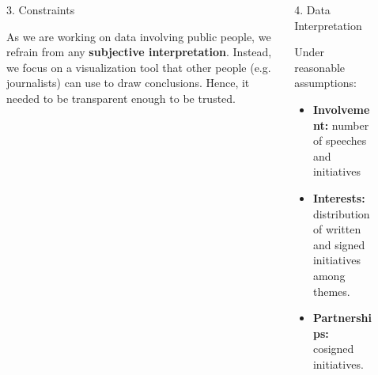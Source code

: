 \documentclass[final]{beamer}
\newlength{\sepwid}
\newlength{\onecolwid}
\newlength{\twocolwid}
\begin{document}
\begin{frame}[t]
\begin{columns}[t]
\begin{column}{\onecolwid}
\end{column} %

\begin{column}{\sepwid}\end{column} %

\begin{column}{\twocolwid} %

\begin{columns}[t,totalwidth=\twocolwid] %

\begin{column}{\onecolwid}\vspace{-.6in} %



\begin{alertblock}{3. Constraints}

As we are working on data involving public people, we refrain from any \textbf{subjective interpretation}. Instead, we focus on a visualization tool that other people (e.g. journalists) can use to draw conclusions. Hence, it needed to be transparent enough to be trusted.

\end{alertblock}



\end{column} %

\begin{column}{\onecolwid}\vspace{-.6in} %



\begin{alertblock}{4. Data Interpretation}

Under reasonable assumptions:
\begin{itemize}
\item \textbf{Involvement:} number of speeches and initiatives
\item \textbf{Interests:} distribution of written and signed initiatives among themes.
\item \textbf{Partnerships:} cosigned initiatives.
\end{itemize}


\end{alertblock}
\end{column}
\end{columns}
\end{column}
\end{columns}
\end{frame}
\end{document}
